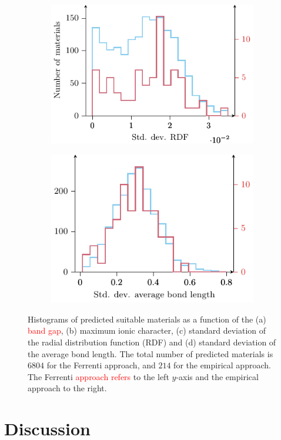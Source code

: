 \documentclass[superscriptaddress,unsortedaddress,
 amsmath,amssymb,
 aps,
]{revtex4-2}
\newcommand{\mrk}[1]{\textcolor{red}{#1}}
\begin{document}
\begin{figure}[t]
\begin{subfigure}[b]{0.45\textwidth}
    \includegraphics{figure7c.pdf}
    \subcaption{}
\end{subfigure}
\begin{subfigure}[b]{0.45\textwidth}
    \includegraphics{figure7d.pdf}
    \subcaption{}
\end{subfigure}
\caption{Histograms of predicted suitable materials as a function of the (a) \mrk{band gap}, (b) maximum ionic character, (c) standard deviation of the radial distribution function (RDF) and (d) standard deviation of the average bond length. The total number of predicted materials is  $6804$ for the Ferrenti approach, and $214$ for the empirical approach. The Ferrenti \mrk{approach refers} to the left $y$-axis and the empirical approach to the right.
}
\label{fig:histogram_new}
\end{figure}

\section*{Discussion} 
\end{document}
